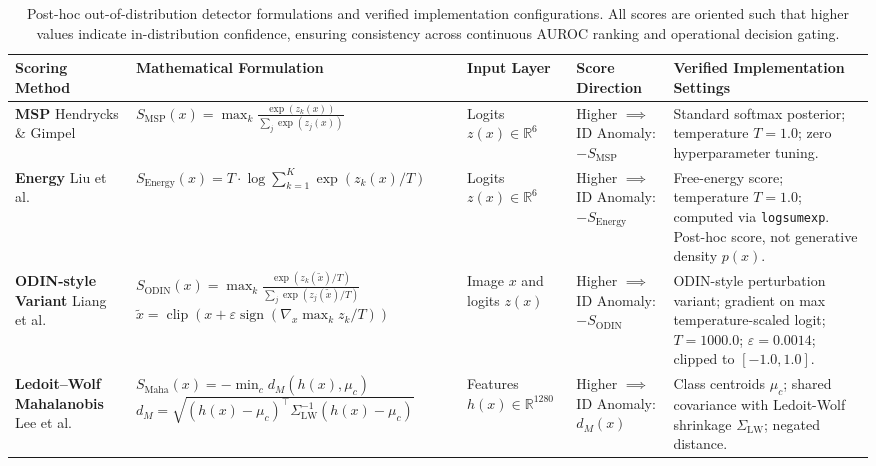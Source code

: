 \begin{table}[!t]
\caption{Post-hoc out-of-distribution detector formulations and verified implementation configurations. All scores are oriented such that higher values indicate in-distribution confidence, ensuring consistency across continuous AUROC ranking and operational decision gating.}
\label{tab:detector_formulations}
\centering
\footnotesize
\setlength{\tabcolsep}{2.5pt}
\begin{tabular}{>{\raggedright\arraybackslash}p{1.8cm} >{\raggedright\arraybackslash}p{4.4cm} >{\centering\arraybackslash}p{1.8cm} >{\centering\arraybackslash}p{2.0cm} >{\raggedright\arraybackslash}p{4.2cm}}
\toprule
\textbf{Scoring Method} & \textbf{Mathematical Formulation} & \textbf{Input Layer} & \textbf{Score Direction} & \textbf{Verified Implementation Settings} \\
\midrule
\textbf{MSP} \newline Hendrycks \& Gimpel \cite{hendrycks2017baseline} & $S_{\text{MSP}}(x) = \max_{k} \frac{\exp(z_k(x))}{\sum_j \exp(z_j(x))}$ & Logits $z(x) \in \mathbb{R}^6$ & Higher $\implies$ ID \newline Anomaly: $-S_{\text{MSP}}$ & Standard softmax posterior; temperature $T = 1.0$; zero hyperparameter tuning. \\
\addlinespace[3pt]
\textbf{Energy} \newline Liu et al. \cite{liu2020energy} & $S_{\text{Energy}}(x) = T \cdot \log \sum_{k=1}^K \exp(z_k(x) / T)$ & Logits $z(x) \in \mathbb{R}^6$ & Higher $\implies$ ID \newline Anomaly: $-S_{\text{Energy}}$ & Free-energy score; temperature $T = 1.0$; computed via \texttt{logsumexp}. Post-hoc score, not generative density $p(x)$. \\
\addlinespace[3pt]
\textbf{ODIN-style Variant} \newline Liang et al. \cite{liang2018enhancing} & $S_{\text{ODIN}}(x) = \max_{k} \frac{\exp(z_k(\tilde{x}) / T)}{\sum_j \exp(z_j(\tilde{x}) / T)}$ \newline $\tilde{x} = \operatorname{clip}(x + \varepsilon \operatorname{sign}(\nabla_x \max_k z_k / T))$ & Image $x$ and logits $z(x)$ & Higher $\implies$ ID \newline Anomaly: $-S_{\text{ODIN}}$ & ODIN-style perturbation variant; gradient on max temperature-scaled logit; $T = 1000.0$; $\varepsilon = 0.0014$; clipped to $[-1.0, 1.0]$. \\
\addlinespace[3pt]
\textbf{Ledoit--Wolf Mahalanobis} \newline Lee et al. \cite{lee2018simple} & $S_{\text{Maha}}(x) = - \min_c d_M(h(x), \mu_c)$ \newline $d_M = \sqrt{(h(x) - \mu_c)^\top \Sigma_{\text{LW}}^{-1} (h(x) - \mu_c)}$ & Features $h(x) \in \mathbb{R}^{1280}$ & Higher $\implies$ ID \newline Anomaly: $d_M(x)$ & Class centroids $\mu_c$; shared covariance with Ledoit-Wolf shrinkage $\Sigma_{\text{LW}}$; negated distance. \\

\end{tabular}
\end{table}

